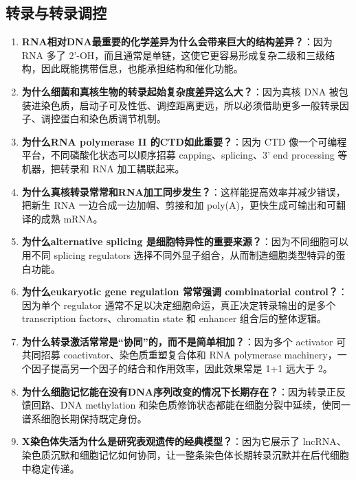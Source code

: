 \documentclass[12pt,fontset=none]{ctexart}
\begin{document}
\subsection*{转录与转录调控}
\begin{enumerate}
\item \textbf{RNA相对DNA最重要的化学差异为什么会带来巨大的结构差异？}：因为 RNA 多了 2'-OH，而且通常是单链，这使它更容易形成复杂二级和三级结构，因此既能携带信息，也能承担结构和催化功能。

\item \textbf{为什么细菌和真核生物的转录起始复杂度差异这么大？}：因为真核 DNA 被包装进染色质，启动子可及性低、调控距离更远，所以必须借助更多一般转录因子、调控蛋白和染色质调节机制。

\item \textbf{为什么RNA polymerase II 的CTD如此重要？}：因为 CTD 像一个可编程平台，不同磷酸化状态可以顺序招募 capping、splicing、3' end processing 等机器，把转录和 RNA 加工耦联起来。

\item \textbf{为什么真核转录常常和RNA加工同步发生？}：这样能提高效率并减少错误，把新生 RNA 一边合成一边加帽、剪接和加 poly(A)，更快生成可输出和可翻译的成熟 mRNA。

\item \textbf{为什么alternative splicing 是细胞特异性的重要来源？}：因为不同细胞可以用不同 splicing regulators 选择不同外显子组合，从而制造细胞类型特异的蛋白功能。

\item \textbf{为什么eukaryotic gene regulation 常常强调 combinatorial control？}：因为单个 regulator 通常不足以决定细胞命运，真正决定转录输出的是多个 transcription factors、chromatin state 和 enhancer 组合后的整体逻辑。

\item \textbf{为什么转录激活常常是“协同”的，而不是简单相加？}：因为多个 activator 可共同招募 coactivator、染色质重塑复合体和 RNA polymerase machinery，一个因子提高另一个因子的结合和作用效率，因此效果常是 1+1 远大于 2。

\item \textbf{为什么细胞记忆能在没有DNA序列改变的情况下长期存在？}：因为转录正反馈回路、DNA methylation 和染色质修饰状态都能在细胞分裂中延续，使同一谱系细胞长期保持既定身份。

\item \textbf{X染色体失活为什么是研究表观遗传的经典模型？}：因为它展示了 lncRNA、染色质沉默和细胞记忆如何协同，让一整条染色体长期转录沉默并在后代细胞中稳定传递。
\end{enumerate}
\end{document}
